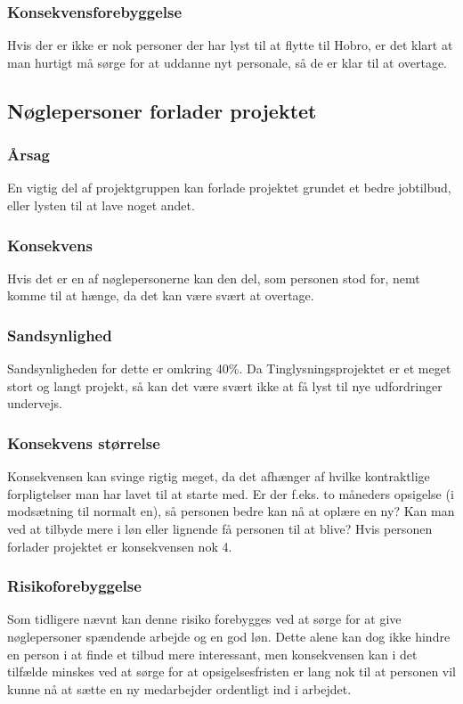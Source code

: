 \documentclass[10pt,a4paper,danish]{article}
\begin{document}
\subsubsection{Konsekvensforebyggelse}
Hvis der er ikke er nok personer der har lyst til at flytte til Hobro, er det klart at man hurtigt må sørge for at uddanne nyt personale, så de er klar til at overtage.

\subsection{Nøglepersoner forlader projektet}
\subsubsection{Årsag}
En vigtig del af projektgruppen kan forlade projektet grundet et bedre jobtilbud, eller lysten til at lave noget andet.

\subsubsection{Konsekvens}
Hvis det er en af nøglepersonerne kan den del, som personen stod for, nemt komme til at hænge, da det kan være svært at overtage. 

\subsubsection{Sandsynlighed}
Sandsynligheden for dette er omkring 40\%. Da Tinglysningsprojektet er et meget stort og langt projekt, så kan det være svært ikke at få lyst til nye udfordringer undervejs.

\subsubsection{Konsekvens størrelse}
Konsekvensen kan svinge rigtig meget, da det afhænger af hvilke kontraktlige forpligtelser man har lavet til at starte med. Er der f.eks. to måneders opsigelse (i modsætning til normalt en), så personen bedre kan nå at oplære en ny? Kan man ved at tilbyde mere i løn eller lignende få personen til at blive? Hvis personen forlader projektet er konsekvensen nok 4.

\subsubsection{Risikoforebyggelse}
Som tidligere nævnt kan denne risiko forebygges ved at sørge for at give nøglepersoner spændende arbejde og en god løn. Dette alene kan dog ikke hindre en person i at finde et tilbud mere interessant, men konsekvensen kan i det tilfælde minskes ved at sørge for at opsigelsesfristen er lang nok til at personen vil kunne nå at sætte en ny medarbejder ordentligt ind i arbejdet.
\end{document}
